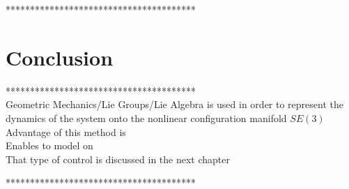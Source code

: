 		
		
		***************************************\\	
		
\section{Conclusion}

***************************************\\
Geometric Mechanics/Lie Groups/Lie Algebra is used in order to represent the dynamics of the system onto the nonlinear configuration manifold $ SE(3) $\\
Advantage of this method is\\
Enables to model on \\
That type of control is discussed in the next chapter


***************************************\\